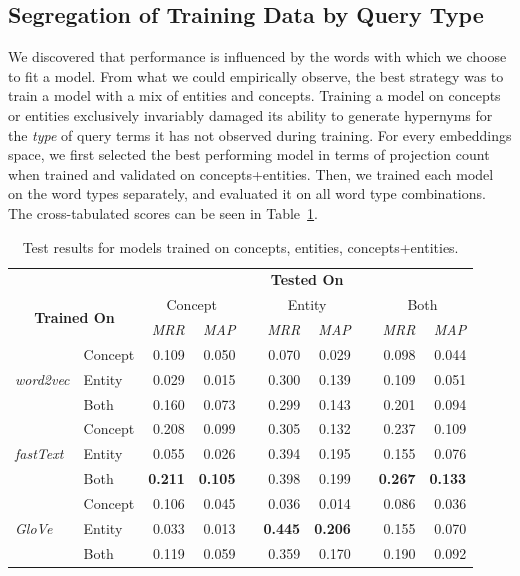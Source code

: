 \subsection{Segregation of Training Data by Query Type}
We discovered that performance is influenced by the words with which we choose to fit a model.  From what we could empirically observe, the best strategy was to train a model with a mix of entities and concepts.  Training a model on concepts or entities exclusively invariably damaged its ability to generate hypernyms for the \textit{type} of query terms it has not observed during training.  For every embeddings space, we first selected the best performing model in terms of projection count when trained and validated on concepts+entities.  Then, we trained each model on the word types separately, and evaluated it on all word type combinations.  The cross-tabulated scores can be seen in Table~\ref{tab:semeval_wordtype_results}.
\begin{table}\centering
\begin{tabular}{@{}llrrcrrcrr@{}}\toprule
& & \multicolumn{8}{c}{\textbf{Tested On}}\\ 
\cmidrule{3-10}
\multicolumn{2}{c}{\multirow[c]{2}{*}{\textbf{Trained On}}} & \multicolumn{2}{c}{Concept} & \phantom{a} & \multicolumn{2}{c}{Entity} & \phantom{a} & \multicolumn{2}{c}{Both}\\ 
\multicolumn{2}{c}{} & \textit{MRR} & \textit{MAP} && \textit{MRR} & \textit{MAP} && \textit{MRR} & \textit{MAP}\\
\cmidrule{3-4} \cmidrule{6-7} \cmidrule{9-10}  
\multirow{3}{*}{\textit{word2vec}} 
& Concept & 0.109 & 0.050 && 0.070 & 0.029 && 0.098 & 0.044\\
& Entity & 0.029 & 0.015 && 0.300 & 0.139 && 0.109 & 0.051\\
& Both & 0.160 & 0.073 && 0.299 & 0.143 && 0.201 & 0.094 \\ \midrule

\multirow{3}{*}{\textit{fastText}} 
& Concept & 0.208 & 0.099 && 0.305 & 0.132 && 0.237 & 0.109\\
& Entity & 0.055 & 0.026 && 0.394 & 0.195 && 0.155 & 0.076\\
& Both & \textbf{0.211} & \textbf{0.105} && 0.398 & 0.199 && \textbf{0.267} & \textbf{0.133}\\ \midrule

\multirow{3}{*}{\textit{GloVe}} 
& Concept & 0.106 & 0.045 && 0.036 & 0.014 && 0.086 & 0.036 \\
& Entity & 0.033 & 0.013 && \textbf{0.445} & \textbf{0.206} && 0.155 & 0.070 \\
& Both & 0.119 & 0.059 && 0.359 & 0.170 && 0.190 & 0.092\\ 
\bottomrule
\end{tabular}
\caption{Test results for models trained on concepts, entities, concepts+entities.}\label{tab:semeval_wordtype_results}
\end{table}

